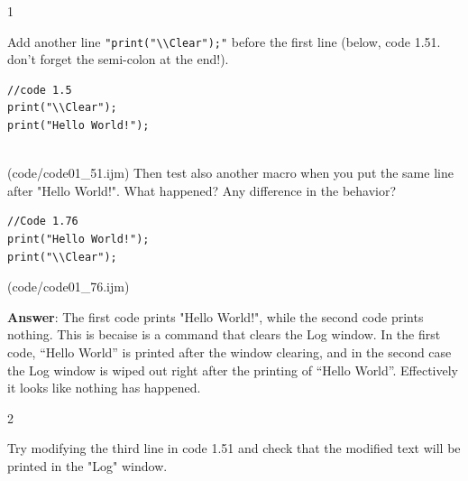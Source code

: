 \begin{indentexercise}
{1}
\item Add another line \texttt{"print("\textbackslash{}\textbackslash{}Clear");"} 
before the first line (below, code 1.51. don't forget the semi-colon at the end!). 
\item 
\begin{lstlisting}
//code 1.5
print("\\Clear");
print("Hello World!");


\end{lstlisting}
(code/code01_51.ijm)
Then test also another macro when you put the same line after "Hello World!". 
What happened? Any difference in the behavior? 
\item 
\begin{lstlisting}
//Code 1.76
print("Hello World!");
print("\\Clear");
\end{lstlisting}
(code/code01_76.ijm)
\item \textbf{Answer}: The first code prints "Hello World!", while the second code prints nothing. This is becaise  is a command that clears the Log window. In the first code, ``Hello World'' is printed after the window clearing, and in the second case the Log window is wiped out right after the printing of ``Hello World''. Effectively it looks like nothing has happened.  
\end{indentexercise}

\begin{indentexercise}
{2}
\item Try modifying the third line in code 1.51
and check that the modified text will be printed in the "Log" window. \\
\end{indentexercise}

